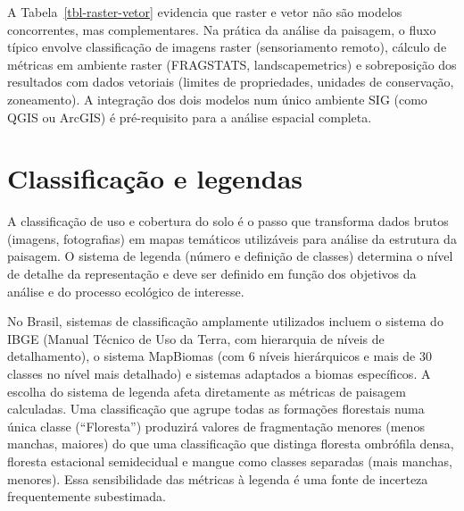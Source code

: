 \documentclass[
  portuguese,
  11pt,
  a4paper,
  open=any]{scrbook}
\begin{document}
A Tabela~\ref{tbl-raster-vetor} evidencia que raster e vetor não são
modelos concorrentes, mas complementares. Na prática da análise da
paisagem, o fluxo típico envolve classificação de imagens raster
(sensoriamento remoto), cálculo de métricas em ambiente raster
(FRAGSTATS, landscapemetrics) e sobreposição dos resultados com dados
vetoriais (limites de propriedades, unidades de conservação,
zoneamento). A integração dos dois modelos num único ambiente SIG (como
QGIS ou ArcGIS) é pré-requisito para a análise espacial completa.

\section{Classificação e legendas}\label{classificauxe7uxe3o-e-legendas}

A classificação de uso e cobertura do solo é o passo que transforma
dados brutos (imagens, fotografias) em mapas temáticos utilizáveis para
análise da estrutura da paisagem. O sistema de legenda (número e
definição de classes) determina o nível de detalhe da representação e
deve ser definido em função dos objetivos da análise e do processo
ecológico de interesse.

No Brasil, sistemas de classificação amplamente utilizados incluem o
sistema do IBGE (Manual Técnico de Uso da Terra, com hierarquia de
níveis de detalhamento), o sistema MapBiomas (com 6 níveis hierárquicos
e mais de 30 classes no nível mais detalhado) e sistemas adaptados a
biomas específicos. A escolha do sistema de legenda afeta diretamente as
métricas de paisagem calculadas. Uma classificação que agrupe todas as
formações florestais numa única classe (``Floresta'') produzirá valores
de fragmentação menores (menos manchas, maiores) do que uma
classificação que distinga floresta ombrófila densa, floresta estacional
semidecidual e mangue como classes separadas (mais manchas, menores).
Essa sensibilidade das métricas à legenda é uma fonte de incerteza
frequentemente subestimada.
\end{document}
